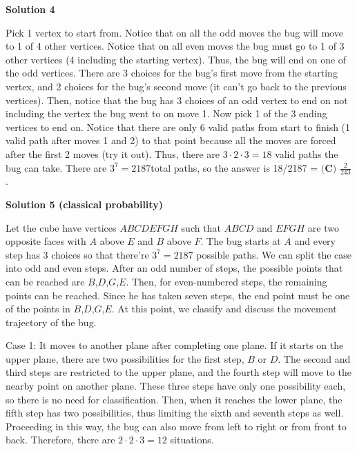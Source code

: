 \begin{enumerate}
 



\textbf{Solution 4}

Pick 1 vertex to start from. Notice that on all the odd moves the bug will move to 1 of 4 other vertices. Notice that on all even moves the bug must go to 1 of 3 other vertices (4 including the starting vertex). Thus, the bug will end on one of the odd vertices. There are 3 choices for the bug's first move from the starting vertex, and 2 choices for the bug's second move (it can't go back to the previous vertices). Then, notice that the bug has 3 choices of an odd vertex to end on not including the vertex the bug went to on move 1. Now pick 1 of the 3 ending vertices to end on. Notice that there are only 6 valid paths from start to finish (1 valid path after moves 1 and 2) to that point because all the moves are forced after the first 2 moves  (try it out). Thus, there are $3 \cdot 2 \cdot 3 = 18$ valid paths the bug can take. There are $3^7 = 2187$total paths, so the answer is 18/2187 = $\boxed{\textbf{(C) }\frac{2}{243}}$.

 



\textbf{Solution 5 (classical probability)}

Let the cube have vertices $ABCDEFGH$ such that $ABCD$ and $EFGH$ are two opposite faces with $A$ above $E$ and $B$ above $F$.  The bug starts at $A$ and every step has 3 choices so that there're $3^7 = 2187$ possible paths. We can split the case into odd and even steps. After an odd number of steps, the possible points that can be reached are $B$,$D$,$G$,$E$. Then, for even-numbered steps, the remaining points can be reached. Since he has taken seven steps, the end point must be one of the points in $B$,$D$,$G$,$E$. At this point, we classify and discuss the movement trajectory of the bug. 

 Case 1: It moves to another plane after completing one plane. If it starts on the upper plane, there are two possibilities for the first step, $B$ or $D$. The second and third steps are restricted to the upper plane, and the fourth step will move to the nearby point on another plane. These three steps have only one possibility each, so there is no need for classification. Then, when it reaches the lower plane, the fifth step has two possibilities, thus limiting the sixth and seventh steps as well. Proceeding in this way, the bug can also move from left to right or from front to back. Therefore, there are $2 \cdot 2 \cdot 3 = 12$ situations. 


\end{enumerate}
